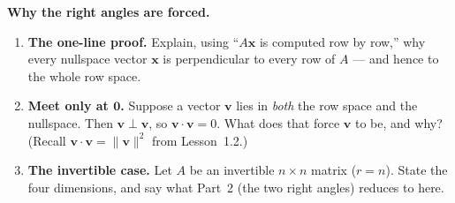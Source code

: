 \documentclass[10pt]{article}
\newcommand{\vv}{\mathbf{v}}
\newcommand{\xx}{\mathbf{x}}
\newcommand{\zero}{\mathbf{0}}
\begin{document}
\begin{tcolorbox}[colback=white, colframe=black!40, title=\textbf{Tier E --- Extension},
    fonttitle=\bfseries, arc=1.5mm, left=3mm, right=3mm, top=2mm, bottom=2mm, breakable]
\textbf{Why the right angles are forced.}
\begin{enumerate}[leftmargin=1.7em, itemsep=9pt]
  \item \textbf{The one-line proof.} Explain, using ``$A\xx$ is computed row by row,'' why every nullspace
        vector $\xx$ is perpendicular to every row of $A$ --- and hence to the whole row space. 
  \item \textbf{Meet only at $\zero$.} Suppose a vector $\vv$ lies in \emph{both} the row space and the
        nullspace. Then $\vv\perp\vv$, so $\vv\cdot\vv=0$. What does that force $\vv$ to be, and why? (Recall
        $\vv\cdot\vv=\|\vv\|^2$ from Lesson~1.2.) 
  \item \textbf{The invertible case.} Let $A$ be an invertible $n\times n$ matrix ($r=n$). State the four
        dimensions, and say what Part~2 (the two right angles) reduces to here. 
\end{enumerate}
\end{tcolorbox}
\end{document}
